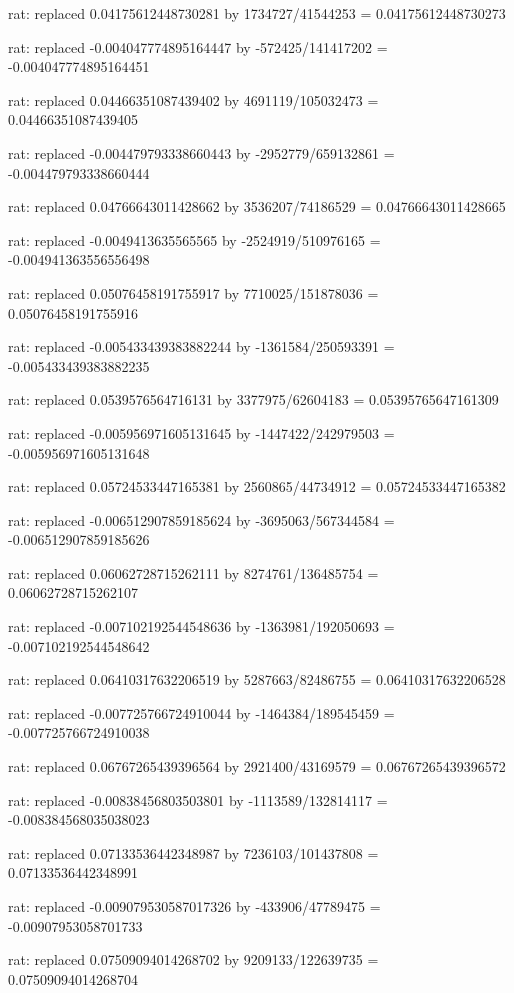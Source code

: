\documentclass[a4paper,10pt]{article}
\begin{document}
\begin{eulernotebook}
\begin{eulercomment}
\begin{eulercomment}
\begin{eulercomment}
\begin{eulercomment}
\begin{eulercomment}
\begin{eulercomment}
\begin{eulercomment}
\begin{eulercomment}
\begin{eulercomment}
\begin{eulercomment}
\begin{eulercomment}
\begin{eulercomment}
\begin{eulercomment}
\begin{eulercomment}
\begin{eulercomment}
\begin{eulercomment}
\begin{euleroutput}
  rat: replaced 0.04175612448730281 by 1734727/41544253 = 0.04175612448730273
  
  rat: replaced -0.004047774895164447 by -572425/141417202 = -0.004047774895164451
  
  rat: replaced 0.04466351087439402 by 4691119/105032473 = 0.04466351087439405
  
  rat: replaced -0.004479793338660443 by -2952779/659132861 = -0.004479793338660444
  
  rat: replaced 0.04766643011428662 by 3536207/74186529 = 0.04766643011428665
  
  rat: replaced -0.0049413635565565 by -2524919/510976165 = -0.004941363556556498
  
  rat: replaced 0.05076458191755917 by 7710025/151878036 = 0.05076458191755916
  
  rat: replaced -0.005433439383882244 by -1361584/250593391 = -0.005433439383882235
  
  rat: replaced 0.0539576564716131 by 3377975/62604183 = 0.05395765647161309
  
  rat: replaced -0.005956971605131645 by -1447422/242979503 = -0.005956971605131648
  
  rat: replaced 0.05724533447165381 by 2560865/44734912 = 0.05724533447165382
  
  rat: replaced -0.006512907859185624 by -3695063/567344584 = -0.006512907859185626
  
  rat: replaced 0.06062728715262111 by 8274761/136485754 = 0.06062728715262107
  
  rat: replaced -0.007102192544548636 by -1363981/192050693 = -0.007102192544548642
  
  rat: replaced 0.06410317632206519 by 5287663/82486755 = 0.06410317632206528
  
  rat: replaced -0.007725766724910044 by -1464384/189545459 = -0.007725766724910038
  
  rat: replaced 0.06767265439396564 by 2921400/43169579 = 0.06767265439396572
  
  rat: replaced -0.00838456803503801 by -1113589/132814117 = -0.008384568035038023
  
  rat: replaced 0.07133536442348987 by 7236103/101437808 = 0.07133536442348991
  
  rat: replaced -0.009079530587017326 by -433906/47789475 = -0.00907953058701733
  
  rat: replaced 0.07509094014268702 by 9209133/122639735 = 0.07509094014268704
  

\end{euleroutput}
\end{eulercomment}
\end{eulercomment}
\end{eulercomment}
\end{eulercomment}
\end{eulercomment}
\end{eulercomment}
\end{eulercomment}
\end{eulercomment}
\end{eulercomment}
\end{eulercomment}
\end{eulercomment}
\end{eulercomment}
\end{eulercomment}
\end{eulercomment}
\end{eulercomment}
\end{eulercomment}
\end{eulernotebook}
\end{document}
